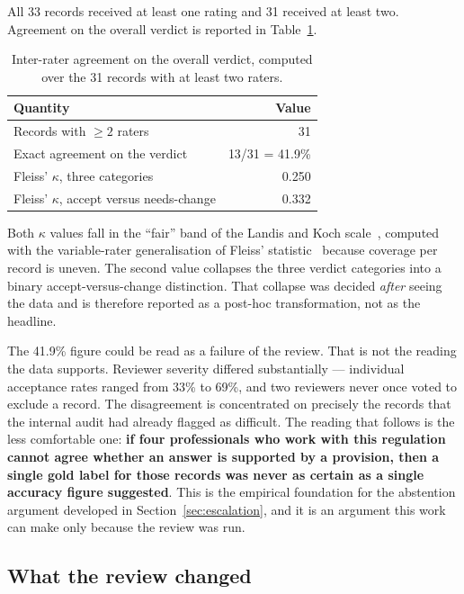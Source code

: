 All 33 records received at least one rating and 31 received at least two.
Agreement on the overall verdict is reported in Table~\ref{tab:agreement}.

\begin{table}[htbp]
  \centering
  \caption{Inter-rater agreement on the overall verdict, computed over the 31 records with at least two raters.}
  \label{tab:agreement}
  \begin{tabular}{lr}
    \toprule
    \textbf{Quantity} & \textbf{Value} \\
    \midrule
    Records with $\geq 2$ raters & 31 \\
    Exact agreement on the verdict & 13/31 = 41.9\% \\
    Fleiss' $\kappa$, three categories & 0.250 \\
    Fleiss' $\kappa$, accept versus needs-change & 0.332 \\
    \bottomrule
  \end{tabular}
\end{table}

Both $\kappa$ values fall in the \enquote{fair} band of the Landis and Koch
scale~\cite{landis1977measurement}, computed with the variable-rater
generalisation of Fleiss' statistic~\cite{fleiss1971measuring,gwet2014interrater} because coverage
per record is uneven. The second value collapses the three verdict categories
into a binary accept-versus-change distinction. That collapse was decided
\emph{after} seeing the data and is therefore reported as a post-hoc
transformation, not as the headline.

The 41.9\% figure could be read as a failure of the review. That is not the
reading the data supports. Reviewer severity differed substantially --- individual acceptance rates
ranged from 33\% to 69\%, and two reviewers never once voted to exclude a record.
The disagreement is concentrated on precisely the records that the internal audit
had already flagged as difficult. The reading that follows is the less comfortable one:
\textbf{if four professionals who work with this regulation cannot agree whether
an answer is supported by a provision, then a single gold label for those records
was never as certain as a single accuracy figure suggested}. This is the
empirical foundation for the abstention argument developed in
Section~\ref{sec:escalation}, and it is an argument this work can make only
because the review was run.

\subsection{What the review changed}

